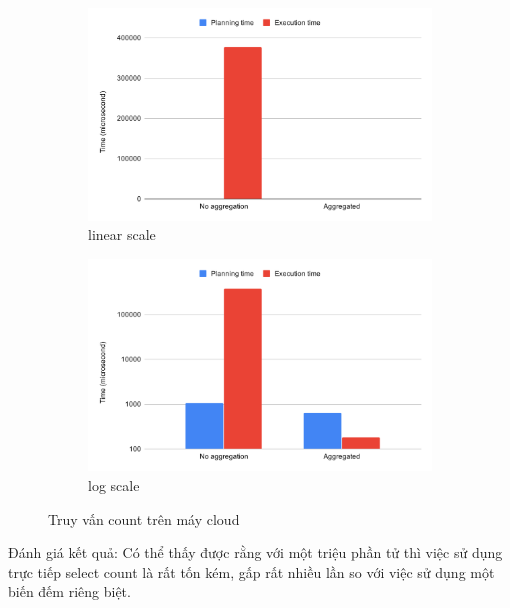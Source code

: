 \begin{figure}[H]
\centering
\begin{subfigure}{0.5\textwidth}
    \centering
    \includegraphics[width=\textwidth]{images/testing/count-cloud.png}
    \caption{linear scale}
\end{subfigure}%
\begin{subfigure}{0.5\textwidth}
    \centering
    \includegraphics[width=\textwidth]{images/testing/count-cloud-log.png}
    \caption{log scale}
\end{subfigure}
\caption{Truy vấn count trên máy cloud}
\end{figure}

Đánh giá kết quả: Có thể thấy được rằng với một triệu phần tử thì
việc sử dụng trực tiếp select count là rất tốn kém, gấp rất nhiều lần
so với việc sử dụng một biến đếm riêng biệt.

